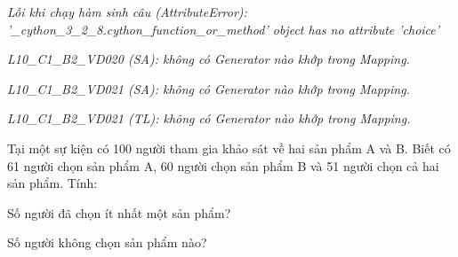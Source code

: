 \documentclass[a4paper,12pt]{article}
\begin{document}
\begin{center}{\small\textit{Lỗi khi chạy hàm sinh câu (AttributeError): '\_cython\_3\_2\_8.cython\_function\_or\_method' object has no attribute 'choice'}}\end{center}

\begin{center}\end{center}

\begin{center}{\small\textit{L10\_C1\_B2\_VD020 (SA): không có Generator nào khớp trong Mapping.}}\end{center}

\begin{center}\end{center}

\begin{center}{\small\textit{L10\_C1\_B2\_VD021 (SA): không có Generator nào khớp trong Mapping.}}\end{center}

\begin{center}\end{center}

\begin{center}{\small\textit{L10\_C1\_B2\_VD021 (TL): không có Generator nào khớp trong Mapping.}}\end{center}

\begin{ex}%
Tại một sự kiện có 100 người tham gia khảo sát về hai sản phẩm A và B. Biết có 61 người chọn sản phẩm A, 60 người chọn sản phẩm B và 51 người chọn cả hai sản phẩm. Tính: 
\begin{listEX}[1]
\item Số người đã chọn ít nhất một sản phẩm? 
\item Số người không chọn sản phẩm nào? 
\end{listEX}

\end{ex}
\end{document}
